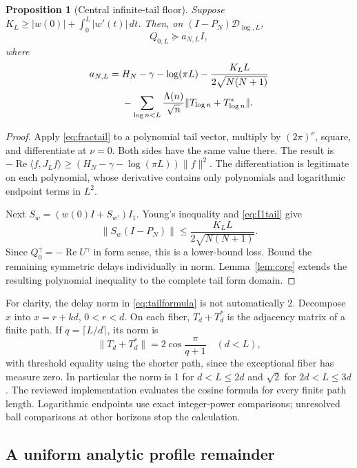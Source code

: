 \documentclass[11pt]{article}
\numberwithin{equation}{section}
\newtheorem{proposition}[theorem]{Proposition}
\theoremstyle{definition}
\theoremstyle{remark}
\newcommand{\DD}{\mathcal D}
\newcommand{\Rea}{\operatorname{Re}}
\newcommand{\norm}[1]{\lVert#1\rVert}
\newcommand{\ip}[2]{\langle#1,#2\rangle}
\begin{document}
\begin{proposition}[Central infinite-tail floor]\label{prop:tail}
Suppose
$K_L\ge |w(0)|+\int_0^L|w'(t)|\,dt$. Then, on
$(I-P_N)\DD_{\log,L}$,
\begin{equation}\label{eq:afloor}
 Q_{0,L}\succeq a_{N,L}I,
\end{equation}
where
\begin{align}
 a_{N,L}={}&H_N-\gamma-\log(\pi L)
 -\frac{K_LL}{2\sqrt{N(N+1)}}\notag\\
 &-\sum_{\log n<L}\frac{\Lambda(n)}{\sqrt n}
 \norm{T_{\log n}+T_{\log n}^*}.
 \label{eq:tailformula}
\end{align}
\end{proposition}
\begin{proof}
Apply \eqref{eq:fractail} to a polynomial tail vector, multiply by
$(2\pi)^\nu$, square, and differentiate at $\nu=0$. Both sides have the
same value there. The result is
$-\Rea\ip f{J_Lf}\ge(H_N-\gamma-\log(\pi L))\norm f^2$.
The differentiation is legitimate on each polynomial, whose derivative
contains only polynomials and logarithmic endpoint terms in $L^2$.

Next $S_w=(w(0)I+S_{w'})I_1$. Young's inequality and \eqref{eq:I1tail}
give
\[
 \norm{S_w(I-P_N)}\le\frac{K_LL}{2\sqrt{N(N+1)}}.
\]
Since $Q^\gamma_0=-\Rea U^\gamma$ in form sense, this is a lower-bound
loss. Bound the remaining symmetric delays individually in norm.
Lemma~\ref{lem:core} extends the resulting polynomial inequality to the
complete tail form domain.
\end{proof}

For clarity, the delay norm in \eqref{eq:tailformula} is not automatically 2.
Decompose $x$ into $x=r+kd$, $0<r<d$. On each fiber,
$T_d+T_d^*$ is the adjacency matrix of a finite path. If
$q=\lceil L/d\rceil$, its norm is
\begin{equation}\label{eq:chainnorm}
 \norm{T_d+T_d^*}=2\cos\frac{\pi}{q+1}
 \quad(d<L),
\end{equation}
with threshold equality using the shorter path, since the exceptional fiber
has measure zero. In particular the norm is 1 for $d<L\le2d$ and
$\sqrt2$ for $2d<L\le3d$. The reviewed implementation evaluates the
cosine formula for every finite path length. Logarithmic endpoints use
exact integer-power comparisons; unresolved ball comparisons at other
horizons stop the calculation.

\subsection{A uniform analytic profile remainder}
\end{document}
